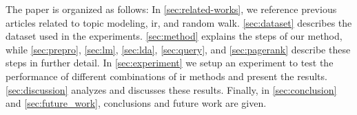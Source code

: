 The paper is organized as follows:
In \autoref{sec:related-works}, we reference previous articles related to topic modeling, \gls{ir}, and random walk.
\autoref{sec:dataset} describes the dataset used in the experiments.
\autoref{sec:method} explains the steps of our method, while \autoref{sec:prepro}, \autoref{sec:lm}, \autoref{sec:lda}, \autoref{sec:query}, and \autoref{sec:pagerank} describe these steps in further detail.
In \autoref{sec:experiment} we setup an experiment to test the performance of different combinations of \gls{ir} methods and present the results.
\autoref{sec:discussion} analyzes and discusses these results.
Finally, in \autoref{sec:conclusion} and \autoref{sec:future_work}, conclusions and future work are given.
